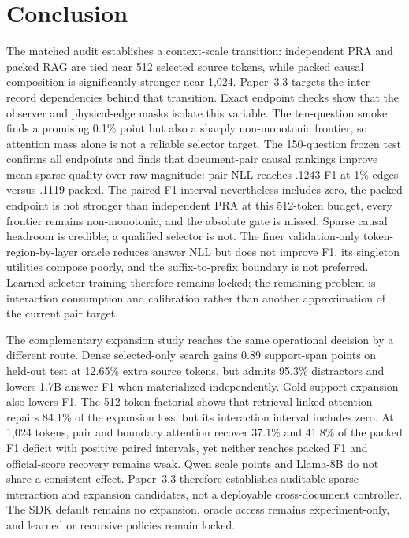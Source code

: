 \documentclass[11pt]{article}
\begin{document}
\section{Conclusion}

The matched audit establishes a context-scale transition: independent PRA and
packed RAG are tied near 512 selected source tokens, while packed causal
composition is significantly stronger near 1,024. Paper~3.3 targets the
inter-record dependencies behind that transition. Exact endpoint checks show
that the observer and physical-edge masks isolate this variable. The
ten-question smoke finds a promising 0.1\% point but also a sharply
non-monotonic frontier, so attention mass alone is not a reliable selector
target. The 150-question frozen test confirms all endpoints and finds that
document-pair causal rankings improve mean sparse quality over raw magnitude:
pair NLL reaches .1243 F1 at 1\% edges versus .1119 packed. The paired F1
interval nevertheless includes zero, the packed endpoint is not stronger than
independent PRA at this 512-token budget, every frontier remains non-monotonic,
and the absolute gate is missed. Sparse causal headroom is credible; a
qualified selector is not.
The finer validation-only token-region-by-layer oracle reduces answer NLL but
does not improve F1, its singleton utilities compose poorly, and the
suffix-to-prefix boundary is not preferred. Learned-selector training therefore
remains locked; the remaining problem is interaction consumption and
calibration rather than another approximation of the current pair target.

The complementary expansion study reaches the same operational decision by a
different route. Dense selected-only search gains 0.89 support-span points on
held-out test at 12.65\% extra source tokens, but admits 95.3\% distractors and
lowers 1.7B answer F1 when materialized independently. Gold-support expansion
also lowers F1. The 512-token factorial shows that retrieval-linked attention
repairs 84.1\% of the expansion loss, but its interaction interval includes
zero. At 1,024 tokens, pair and boundary attention recover 37.1\% and 41.8\%
of the packed F1 deficit with positive paired intervals, yet neither reaches
packed F1 and official-score recovery remains weak. Qwen scale points and
Llama-8B do not share a consistent effect. Paper~3.3 therefore establishes
auditable sparse interaction and expansion candidates, not a deployable
cross-document controller. The SDK default remains no expansion, oracle
access remains experiment-only, and learned or recursive policies remain
locked.
\end{document}
